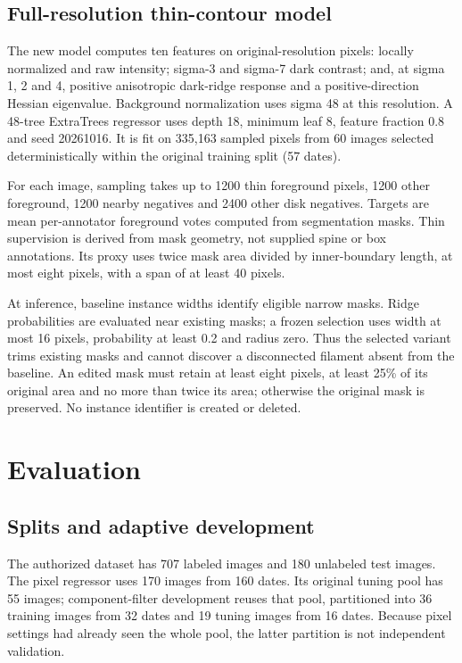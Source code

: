 \documentclass[sigconf]{acmart}
\begin{document}
\subsection{Full-resolution thin-contour model}
The new model computes ten features on original-resolution pixels: locally normalized and raw intensity; sigma-3 and sigma-7 dark contrast; and, at sigma 1, 2 and 4, positive anisotropic dark-ridge response and a positive-direction Hessian eigenvalue. Background normalization uses sigma 48 at this resolution. A 48-tree ExtraTrees regressor uses depth 18, minimum leaf 8, feature fraction 0.8 and seed 20261016. It is fit on 335,163 sampled pixels from 60 images selected deterministically within the original training split (57 dates).

For each image, sampling takes up to 1200 thin foreground pixels, 1200 other foreground, 1200 nearby negatives and 2400 other disk negatives. Targets are mean per-annotator foreground votes computed from segmentation masks. Thin supervision is derived from mask geometry, not supplied spine or box annotations. Its proxy uses twice mask area divided by inner-boundary length, at most eight pixels, with a span of at least 40 pixels.

At inference, baseline instance widths identify eligible narrow masks. Ridge probabilities are evaluated near existing masks; a frozen selection uses width at most 16 pixels, probability at least 0.2 and radius zero. Thus the selected variant trims existing masks and cannot discover a disconnected filament absent from the baseline. An edited mask must retain at least eight pixels, at least 25\% of its original area and no more than twice its area; otherwise the original mask is preserved. No instance identifier is created or deleted.
\section{Evaluation}
\subsection{Splits and adaptive development}
The authorized dataset has 707 labeled images and 180 unlabeled test images. The pixel regressor uses 170 images from 160 dates. Its original tuning pool has 55 images; component-filter development reuses that pool, partitioned into 36 training images from 32 dates and 19 tuning images from 16 dates. Because pixel settings had already seen the whole pool, the latter partition is not independent validation.
\end{document}
